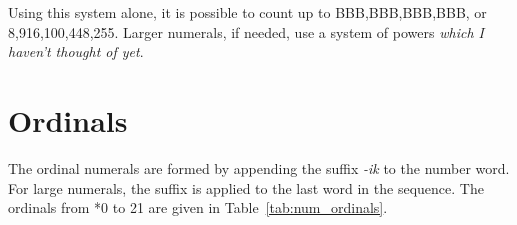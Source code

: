 \documentclass[grammar]{subfiles}
\begin{document}
  Using this system alone, it is possible to count up to BBB,BBB,BBB,BBB\duo, or 8,916,100,448,255\dec. Larger numerals, if needed, use a system of powers \emph{which I haven't thought of yet}.

  \section{Ordinals}
  \label{sec:num_ordinals}

  The ordinal numerals are formed by appending the suffix \textit{-ik} to the number word. For large numerals, the suffix is applied to the last word in the sequence. The ordinals from *0 to 21\dec{} are given in Table~\ref{tab:num_ordinals}.

  \begin{table}[htpb]\small\capstart
    \begin{center}
      \qquad
      \caption{Ordinal numerals from 0\dec\ to 21\dec\label{tab:num_ordinals}}
    \end{center}
  \end{table}
\end{document}
